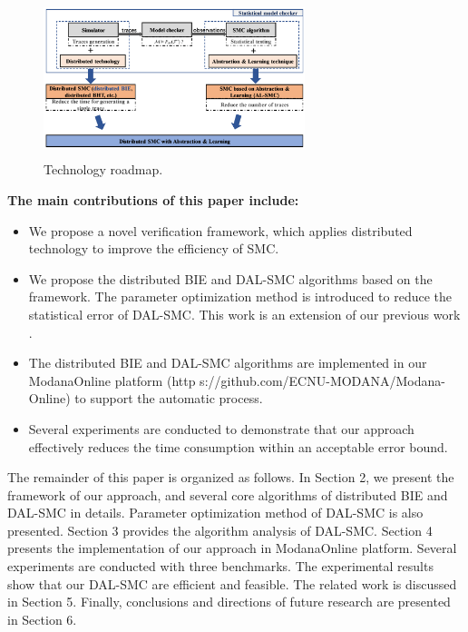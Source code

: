 \begin{figure}[htbp]
	{
	\centering	
	\includegraphics[width=3.0in,height=1.8in]{fig/paper-framework.png}
\caption{Technology roadmap.}\label{tech-map}	
	}
	
\end{figure}

\textbf{The main contributions of this paper include:} 
\begin{itemize}
\item
We propose a novel verification framework, which applies distributed technology to improve the efficiency of SMC.
\item
We propose the distributed BIE and DAL-SMC algorithms based on the framework. The parameter optimization method is introduced to reduce the statistical error of DAL-SMC. This work is an extension of our previous work \cite{jiangkaiqiang2016}.
\item
The distributed BIE and DAL-SMC algorithms are implemented in our ModanaOnline platform  \cite{Cheng2015Modana} (http
s://github.com/ECNU-MODANA/Modana-Online) to support the automatic process. 
\item
Several experiments are conducted to demonstrate that our approach effectively reduces the time consumption within an acceptable error bound.
\end{itemize}

The remainder of this paper is organized as follows. In Section 2, we present the framework of our approach, and several core algorithms of distributed BIE and DAL-SMC in details. Parameter optimization method of DAL-SMC is also presented. Section 3 provides the algorithm analysis of DAL-SMC. Section 4 presents the implementation of our approach in ModanaOnline platform. Several experiments are conducted with three benchmarks. The experimental results show that our DAL-SMC are efficient and feasible. The related work is discussed in Section 5. Finally, conclusions and directions of future research are presented in Section 6. 